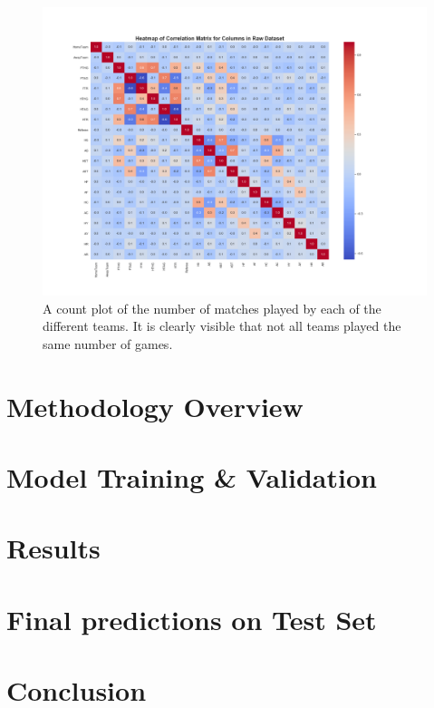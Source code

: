 \documentclass[a4paper,12pt]{article}
\begin{document}
		\begin{figure}[H]
			\centering
			
			\includegraphics[scale=0.4]{raw_corr_heatmap.png}
			\caption{A count plot of the number of matches played by each of the different teams. It is clearly visible that not all teams played the same number of games.}
		\end{figure}
		
	
	
	
\section{Methodology Overview}

\section{Model Training \& Validation}

\section{Results}

\section{Final predictions on Test Set}

\section{Conclusion}
\end{document}
